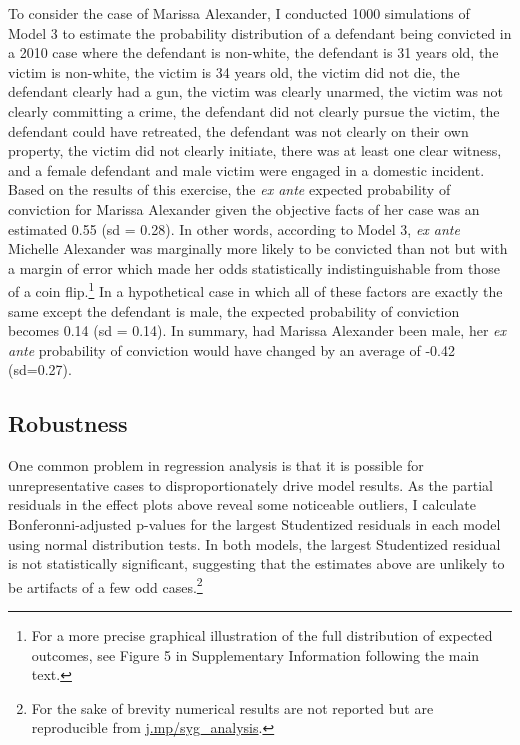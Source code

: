 \documentclass[12pt,article]{article}
\begin{document}
To consider the case of Marissa Alexander, I conducted 1000 simulations
of Model 3 to estimate the probability distribution of a defendant being
convicted in a 2010 case where the defendant is non-white, the defendant
is 31 years old, the victim is non-white, the victim is 34 years old,
the victim did not die, the defendant clearly had a gun, the victim was
clearly unarmed, the victim was not clearly committing a crime, the
defendant did not clearly pursue the victim, the defendant could have
retreated, the defendant was not clearly on their own property, the
victim did not clearly initiate, there was at least one clear witness,
and a female defendant and male victim were engaged in a domestic
incident. Based on the results of this exercise, the \emph{ex ante}
expected probability of conviction for Marissa Alexander given the
objective facts of her case was an estimated 0.55 (sd = 0.28). In other
words, according to Model 3, \emph{ex ante} Michelle Alexander was
marginally more likely to be convicted than not but with a margin of
error which made her odds statistically indistinguishable from those of
a coin flip.\footnote{For a more precise graphical illustration of the
  full distribution of expected outcomes, see Figure 5 in Supplementary
  Information following the main text.} In a hypothetical case in which
all of these factors are exactly the same except the defendant is male,
the expected probability of conviction becomes 0.14 (sd = 0.14). In
summary, had Marissa Alexander been male, her \emph{ex ante} probability
of conviction would have changed by an average of -0.42 (sd=0.27).

\subsection{Robustness}\label{robustness}

One common problem in regression analysis is that it is possible for
unrepresentative cases to disproportionately drive model results. As the
partial residuals in the effect plots above reveal some noticeable
outliers, I calculate Bonferonni-adjusted p-values for the largest
Studentized residuals in each model using normal distribution tests. In
both models, the largest Studentized residual is not statistically
significant, suggesting that the estimates above are unlikely to be
artifacts of a few odd cases.\footnote{For the sake of brevity numerical
  results are not reported but are reproducible from
  \href{http://j.mp/syg_analysis}{j.mp/syg\_analysis}.}
\end{document}
